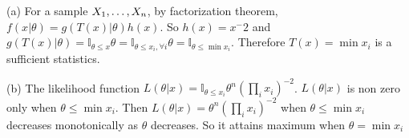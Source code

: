 \documentclass[12pt]{article}
\begin{document}
(a) For a sample $X_1,\ldots, X_n$, by factorization theorem, $f(x|\theta) = g(T(x)|\theta)h(x)$. So $h(x) = x^-2$ and $g(T(x)|\theta) =  \mathbb{I}_{\theta \leq x} \theta = \mathbb{I}_{\theta \leq x_i,  \forall i} \theta = \mathbb{I}_{\theta \leq \min{x_i} }$. Therefore $T(x) = \min{x_i}$ is a sufficient statistics.

(b) The likelihood function $L(\theta | x) = \mathbb{I}_{\theta \leq x_i} \theta^n (\prod_i x_i)^{-2}$. $L(\theta | x)$ is non zero only when $\theta \leq \min{x_i}$. Then $L(\theta | x) = \theta^n (\prod_i x_i)^{-2} $ when $\theta \leq \min{x_i}$ decreases monotonically as $\theta$ decreases. So it attains maximum when $\theta = \min{x_i}$
\end{document}
